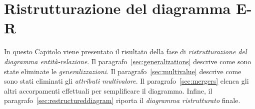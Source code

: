 \chapter{Ristrutturazione del diagramma E-R}
In questo Capitolo viene presentato il risultato della fase di {\it ristrutturazione del diagramma entità-relazione}. Il
paragrafo~\vref{sec:generalizations} descrive come sono state eliminate le {\it generalizzazioni}. Il
paragrafo~\vref{sec:multivalue} descrive come sono stati eliminati gli {\it attributi multivalore}. Il
paragrafo~\vref{sec:mergers} elenca gli altri accorpamenti effettuali per semplificare il diagramma. Infine,
il paragrafo~\vref{sec:restructureddiagram} riporta il {\it diagramma ristrutturato} finale.



%

